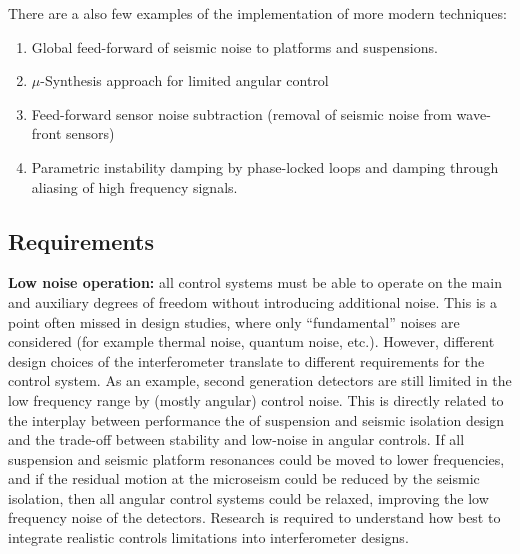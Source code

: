 There are a also few examples of the implementation of more modern techniques:
\begin{enumerate}
\item  Global feed-forward of seismic noise to platforms and suspensions.
\item  $\mu$-Synthesis approach for limited angular control
\item  Feed-forward sensor noise subtraction (removal of seismic noise from wave-front sensors)
\item  Parametric instability damping by phase-locked loops and damping through aliasing of high frequency signals.
\end{enumerate}

\subsection{Requirements}
{\bf Low noise operation:} all control systems must be able to operate on the main and auxiliary degrees of freedom without introducing additional noise. This is a point often missed in design studies, where only ``fundamental'' noises are considered (for example thermal noise, quantum noise, etc.). However, different design choices of the interferometer translate to different requirements for the control system. As an example, second generation detectors are still limited in the low frequency range by (mostly angular) control noise. This is directly related to the interplay between performance the of suspension and seismic isolation design and the trade-off between stability and low-noise in angular controls. If all suspension and seismic platform resonances could be moved to lower frequencies, and if the residual motion at the microseism could be reduced by the seismic isolation, then all angular control systems could be relaxed, improving the low frequency noise of the detectors. Research is required to understand how best to integrate realistic controls limitations into interferometer designs.\par
